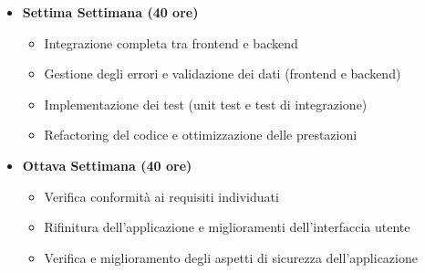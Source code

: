 {\begin{itemize}
        \begin{itemize}
            \item Sviluppo delle funzionalità di commento e revisione ai post (backend e frontend)
        \end{itemize}
        \item \textbf{Settima Settimana (40 ore)} 
        \begin{itemize}
            \item Integrazione completa tra frontend e backend
            \item Gestione degli errori e validazione dei dati (frontend e backend)
            \item Implementazione dei test (unit test e test di integrazione)
            \item Refactoring del codice e ottimizzazione delle prestazioni
        \end{itemize}
        \item \textbf{Ottava Settimana (40 ore)} 
        \begin{itemize}
            \item Verifica conformità ai requisiti individuati
            \item Rifinitura dell'applicazione e miglioramenti dell'interfaccia utente
            \item Verifica e miglioramento degli aspetti di sicurezza dell'applicazione
        \end{itemize}
    \end{itemize}
}

\newcommand{\totaleOre}{312}

